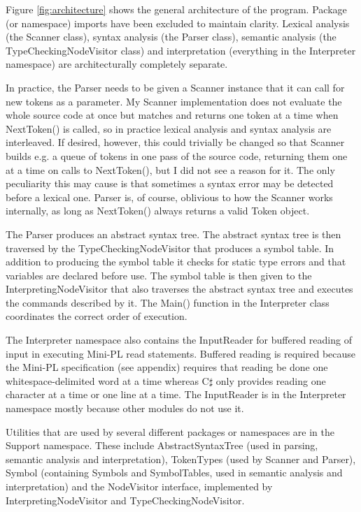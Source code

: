 \documentclass[a4paper,11pt]{article}
\begin{document}
Figure \ref{fig:architecture} shows the general architecture of the program. Package (or namespace) imports have been excluded to maintain clarity. Lexical analysis (the Scanner class), syntax analysis (the Parser class), semantic analysis (the TypeCheckingNodeVisitor class) and interpretation (everything in the Interpreter namespace) are architecturally completely separate.

In practice, the Parser needs to be given a Scanner instance that it can call for new tokens as a parameter. My Scanner implementation does not evaluate the whole source code at once but matches and returns one token at a time when NextToken() is called, so in practice lexical analysis and syntax analysis are interleaved. If desired, however, this could trivially be changed so that Scanner builds e.g. a queue of tokens in one pass of the source code, returning them one at a time on calls to NextToken(), but I did not see a reason for it. The only peculiarity this may cause is that sometimes a syntax error may be detected before a lexical one. Parser is, of course, oblivious to how the Scanner works internally, as long as NextToken() always returns a valid Token object.

The Parser produces an abstract syntax tree. The abstract syntax tree is then traversed by the TypeCheckingNodeVisitor that produces a symbol table. In addition to producing the symbol table it checks for static type errors and that variables are declared before use. The symbol table is then given to the InterpretingNodeVisitor that also traverses the abstract syntax tree and executes the commands described by it. The Main() function in the Interpreter class coordinates the correct order of execution.

The Interpreter namespace also contains the InputReader for buffered reading of input in executing Mini-PL read statements. Buffered reading is required because the Mini-PL specification (see appendix) requires that reading be done one whitespace-delimited word at a time whereas C$\sharp$ only provides reading one character at a time or one line at a time. The InputReader is in the Interpreter namespace mostly because other modules do not use it.

Utilities that are used by several different packages or namespaces are in the Support namespace. These include AbstractSyntaxTree (used in parsing, semantic analysis and interpretation), TokenTypes (used by Scanner and Parser), Symbol (containing Symbols and SymbolTables, used in semantic analysis and interpretation) and the NodeVisitor interface, implemented by InterpretingNodeVisitor and TypeCheckingNodeVisitor.
\end{document}
